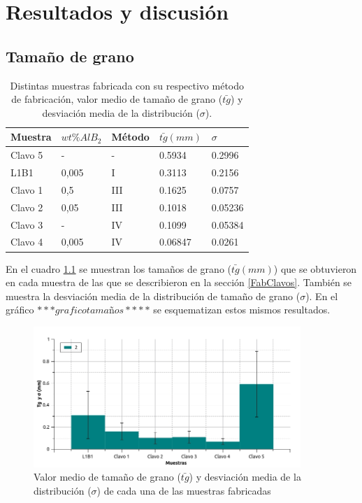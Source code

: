 \documentclass[a4paper,12pt,fleqn,twoside,openany]{book}
\begin{document}
\chapter{Resultados y discusión}



\section{Tamaño de grano}


\begin{table} \label{tab:ResClavos}
\begin{center}
\begin{tabular}{@{}lllll@{}} \toprule
Muestra & $wt \% AlB_2$ & Método & $\bar{tg} (mm)$ & $\sigma$ \\ \midrule
Clavo 5 &  -   & - & 0.5934 & 0.2996   \\
L1B1    &  0,005 & I   & 0.3113 & 0.2156  \\
Clavo 1 &  0,5   & III & 0.1625 & 0.0757   \\
Clavo 2 &  0,05  & III & 0.1018 & 0.05236   \\
Clavo 3 &  -     & IV  & 0.1099  & 0.05384   \\
Clavo 4 &  0,005 & IV  & 0.06847 & 0.0261   \\
\bottomrule
\end{tabular}
\caption{Distintas muestras fabricada con su respectivo método de fabricación, valor medio de tamaño de grano ($\bar{tg}$) y desviación media de la distribución ($\sigma$).}
\end{center}
\end{table}


En el cuadro \ref{tab:ResClavos} se muestran los tamaños de grano ($\bar{tg} (mm)$) que se obtuvieron en cada muestra de las que se describieron en la sección \ref{FabClavos}. También se muestra la desviación media de la distribución de tamaño de grano ($\sigma$). En el gráfico $***grafico tamaños****$ se esquematizan estos mismos resultados.

 \begin{figure}[h]
 \centering
 \includegraphics[width=0.9\textwidth]{Img/Resultados/clavos/TamGranos.jpg}
 \caption{Valor medio de tamaño de grano ($\bar{tg}$) y desviación media de la distribución ($\sigma$) de cada una de las muestras fabricadas} 
 \label{fig:tamanos}
 \end{figure}
\end{document}
